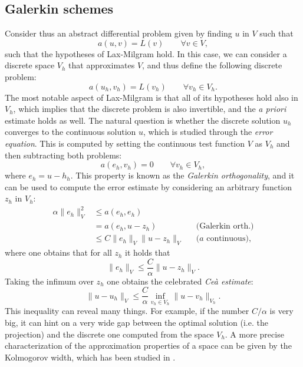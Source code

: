 \documentclass{article}
\begin{document}
\subsection{Galerkin schemes}
Consider thus an abstract differential problem given by finding $u$ in $V$ such that
    $$ a(u, v) = L(v) \qquad \forall v \in V, $$
such that the hypotheses of Lax-Milgram hold. In this case, we can consider a discrete space $V_h$ that approximates $V$, and thus define the following discrete problem: 
    \begin{equation*}\label{eq:galerkinscheme}
    a(u_h, v_h) = L(v_h) \qquad \forall v_h \in V_h.
    \end{equation*}
The most notable aspect of Lax-Milgram is that all of its hypotheses hold also in $V_h$, which implies that the discrete problem is also invertible, and the \emph{a priori} estimate holds as well. The natural question is whether the discrete solution $u_h$ converges to the continuous solution $u$, which is studied through the \emph{error equation}. This is computed by setting the continuous test function $V$ as $V_h$ and then subtracting both problems: 
    $$ a(e_h, v_h) = 0 \qquad \forall v_h \in V_h, $$
where $e_h = u - h_h$.  This property is known as the \emph{Galerkin orthogonality}, and it can be used to compute the error estimate by considering an arbitrary function $z_h$ in $V_h$:
    $$ \begin{aligned}
        \alpha \| e_h \|_V^2 &\leq a(e_h, e_h) && \\ 
                             &= a(e_h, u - z_h) && \text{(Galerkin orth.)} \\
                             &\leq C\|e_h\|_V \|u - z_h\|_V &&\text{($a$ continuous)},
        \end{aligned} $$
where one obtains that for all $z_h$ it holds that
    $$ \| e_h \|_V \leq \frac C \alpha \|u - z_h\|_V. $$
Taking the infimum over $z_h$ one obtains the celebrated \emph{Ceà estimate}: 
    $$ \| u - u_h \|_V \leq \frac C \alpha \inf_{v_h\in V_h} \|u - v_h\|_{V_h}. $$
This inequality can reveal many things. For example, if the number $C/\alpha$ is very big, it can hint on a very wide gap between the optimal solution (i.e. the projection) and the discrete one computed from the space $V_h$. A more precise characterization of the approximation properties of a space can be given by the Kolmogorov width, which has been studied in \cite{evans2009n}.
\end{document}
